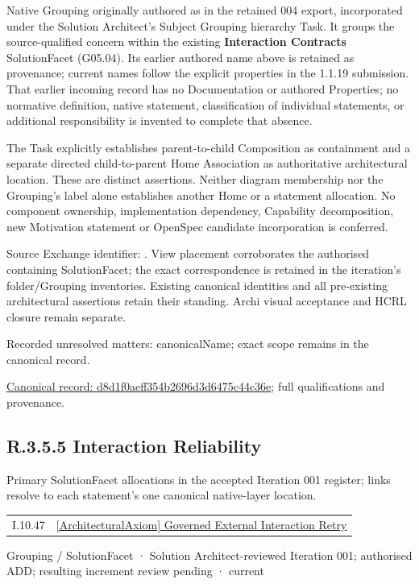 Native Grouping originally authored as \texttt{} in the retained 004 export,
incorporated under the Solution Architect's Subject Grouping hierarchy Task.
It groups the source-qualified \texttt{} concern within
the existing \textbf{Interaction Contracts} SolutionFacet (G05.04). Its earlier authored name above is retained as provenance; current names
follow the explicit properties in the 1.1.19 submission.
That earlier incoming record has no Documentation or authored Properties; no normative
definition, native statement, classification of individual statements, or
additional responsibility is invented to complete that absence.



The Task explicitly establishes parent-to-child Composition as containment and
a separate directed child-to-parent Home Association as authoritative architectural
location. These are distinct assertions. Neither diagram membership nor the
Grouping's label alone establishes another Home or a statement allocation.
No component ownership, implementation dependency, Capability decomposition,
new Motivation statement or OpenSpec candidate incorporation is conferred.



Source Exchange identifier: \texttt{}. View placement corroborates
the authorised containing SolutionFacet; the exact correspondence is retained in the
iteration's folder/Grouping inventories. Existing canonical identities and all
pre-existing architectural assertions retain their standing. Archi visual
acceptance and HCRL closure remain separate.


{\small Recorded unresolved matters: canonicalName; exact scope remains in the canonical record.}\par
{\footnotesize \href{../../../../../../../continuum/grouping/d8d1f0aeff354b2696d3d6475c44c36e.md}{Canonical record: d8d1f0aeff354b2696d3d6475c44c36e}; full qualifications and provenance.}\par
\subsection*{R.3.5.5 Interaction Reliability}
\label{navigation:R.3.5.5}

Primary SolutionFacet allocations in the accepted Iteration 001 register; links resolve to each statement’s one canonical native-layer location.\par
\begin{longtable}{p{.22\linewidth}p{.73\linewidth}}
I.10.47 & \hyperref[element:49c13eb367b44565a011a77b90108cb8]{[ArchitecturalAxiom] Governed External Interaction Retry} \\
\end{longtable}
\label{element:1d7c50343cca49eeaeccf7c49c3c008b}
{\small Grouping / SolutionFacet · Solution Architect-reviewed Iteration 001; authorised ADD; resulting increment review pending · current}\par


